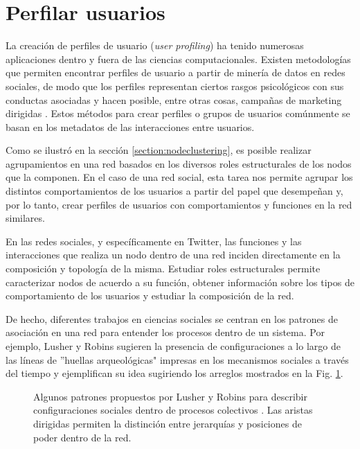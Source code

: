 \section{Perfilar usuarios}\label{sec:proposal:users}
 La creación de perfiles de usuario (\textit{user profiling}) ha tenido numerosas aplicaciones dentro y fuera de las ciencias computacionales. Existen metodologías que permiten encontrar perfiles de usuario a partir de minería de datos en redes sociales, de modo que los perfiles representan ciertos rasgos psicológicos con sus conductas asociadas y hacen posible, entre otras cosas, campañas de marketing dirigidas \cite{hu_cambridge_2020}. Estos métodos para crear perfiles o grupos de usuarios comúnmente se basan en los metadatos de las interacciones entre usuarios.
 
Como se ilustró en la sección \ref{section:nodeclustering}, es posible realizar agrupamientos en una red basados en los diversos roles estructurales de los nodos que la componen. En el caso de una red social, esta tarea nos permite agrupar los distintos comportamientos de los usuarios a partir del papel que desempeñan y, por lo tanto, crear perfiles de usuarios con comportamientos y funciones en la red similares.
 
En las redes sociales, y específicamente en Twitter, las funciones y las interacciones que realiza un nodo dentro de una red inciden directamente en la composición y topología de la misma. Estudiar roles estructurales permite caracterizar nodos de acuerdo a su función, obtener información sobre los tipos de comportamiento de los usuarios y estudiar la composición de la red.

De hecho, diferentes trabajos en ciencias sociales se centran en los patrones de asociación en una red para entender los procesos dentro de un sistema. Por ejemplo, Lusher y Robins sugieren la presencia de configuraciones a lo largo de las líneas de ''huellas arqueológicas" impresas en los mecanismos sociales a través del tiempo y ejemplifican su idea sugiriendo los arreglos mostrados en la Fig. \ref{fig:lusher}.

\begin{figure}[htbp]
  \centering
  
    \caption{Algunos patrones propuestos por Lusher y Robins para describir configuraciones sociales dentro de procesos colectivos \citep{lusher_exponential_nodate}. Las aristas dirigidas permiten la distinción entre jerarquías y posiciones de poder dentro de la red.}
    \label{fig:lusher}
\end{figure}

